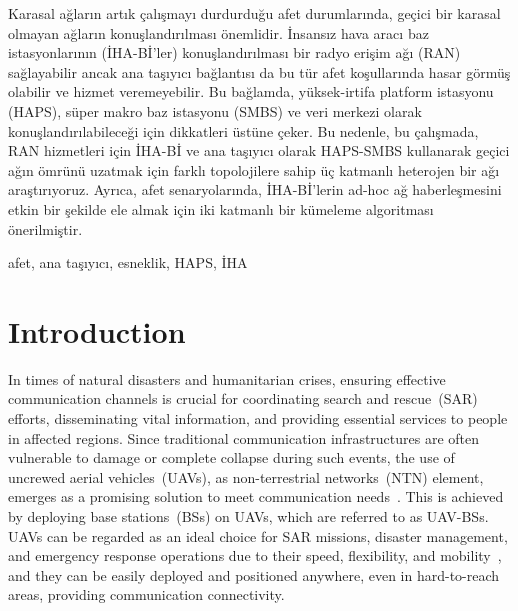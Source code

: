 \documentclass[conference, a4paper]{IEEEtran}
\begin{document}
\begin{ozet}
Karasal ağların artık çalışmayı durdurduğu afet durumlarında, geçici bir karasal olmayan ağların konuşlandırılması önemlidir. 
İnsansız hava aracı baz istasyonlarının (İHA-Bİ'ler) konuşlandırılması bir radyo erişim ağı (RAN) sağlayabilir ancak ana taşıyıcı bağlantısı da bu tür afet koşullarında hasar görmüş olabilir ve hizmet veremeyebilir. 
Bu bağlamda, yüksek-irtifa platform istasyonu (HAPS), süper makro baz istasyonu (SMBS) ve veri merkezi olarak konuşlandırılabileceği için dikkatleri üstüne çeker. 
Bu nedenle, bu çalışmada, RAN hizmetleri için İHA-Bİ ve ana taşıyıcı olarak HAPS-SMBS kullanarak geçici ağın ömrünü uzatmak için farklı topolojilere sahip üç katmanlı heterojen bir ağı araştırıyoruz. 
Ayrıca, afet senaryolarında, İHA-Bİ'lerin ad-hoc ağ haberleşmesini etkin bir şekilde ele almak için iki katmanlı bir kümeleme algoritması önerilmiştir.
\end{ozet}
\begin{IEEEanahtar}
afet, ana taşıyıcı, esneklik, HAPS, İHA
\end{IEEEanahtar}




\IEEEpeerreviewmaketitle

\IEEEpubidadjcol

\section{Introduction}
In times of natural disasters and humanitarian crises, ensuring effective communication channels is crucial for coordinating search and rescue~(SAR) efforts, disseminating vital information, and providing essential services to people in affected regions. 
Since traditional communication infrastructures are often vulnerable to damage or complete collapse during such events, the use of uncrewed aerial vehicles~(UAVs), as non-terrestrial networks~(NTN) element, emerges as a promising solution to meet communication needs~\cite{UAV_disaster}.
This is achieved by deploying base stations~(BSs) on UAVs, which are referred to as UAV-BSs.
UAVs can be regarded as an ideal choice for SAR missions, disaster management, and emergency response operations due to their speed, flexibility, and mobility~\cite{UAV_disaster}, and they can be easily deployed and positioned anywhere, even in hard-to-reach areas, providing communication connectivity. 
\end{document}
